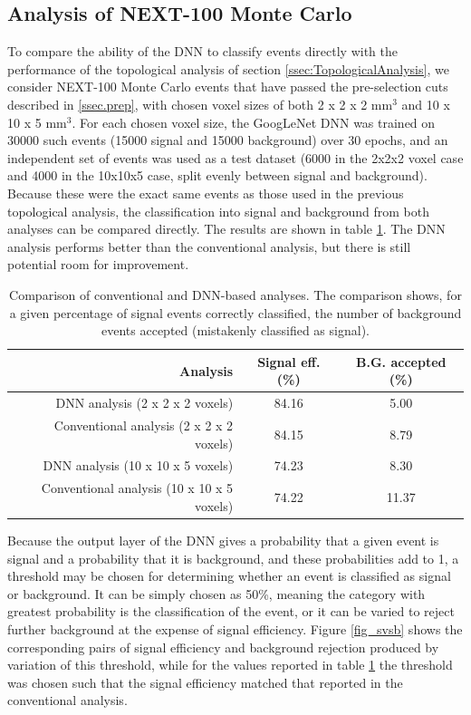 \documentclass[a4paper,11pt]{article}
\begin{document}
\subsection{Analysis of NEXT-100 Monte Carlo}\label{ssec:NEXTMCanalysis}
To compare the ability of the DNN to classify events directly with the performance of the topological analysis of section \ref{ssec:TopologicalAnalysis}, we consider NEXT-100 Monte Carlo 
events that have passed the pre-selection cuts described in \ref{ssec.prep}, with chosen voxel sizes of both 2 x 2 x 2 mm$^3$ and 10 x 10 x 5 mm$^3$.  For each chosen voxel size, the 
GoogLeNet DNN was trained on 30000 such events (15000 signal and 15000 background) over 30 epochs, 
and an independent set of events was used as a test dataset (6000 in the 2x2x2 voxel case and 4000 in the 10x10x5 case, split evenly between signal and background).  Because these were 
the exact same events as those used in the previous
topological analysis, the classification into signal and background from both analyses can be compared directly.  The results are shown in table \ref{tbl.DNNcomparison}.  The DNN
analysis performs better than the conventional analysis, but there is still potential room for improvement.  

\begin{table}[!htb]
	\begin{center}
		\caption[DNN analysis summary]{\label{tbl.DNNcomparison}Comparison of conventional and DNN-based analyses.  The comparison shows, for a given percentage of signal events
			correctly classified, the number of background events accepted (mistakenly classified as signal).}
		\begin{tabular}{rcc}
			\\
			\textbf{Analysis} & \textbf{Signal eff. (\%)} & \textbf{B.G. accepted (\%)}\\
			\hline
			DNN analysis (2 x 2 x 2 voxels) & 84.16 & 5.00\\
			Conventional analysis (2 x 2 x 2 voxels) & 84.15 & 8.79\\
			\hline
			DNN analysis (10 x 10 x 5 voxels) & 74.23 & 8.30\\
			Conventional analysis (10 x 10 x 5 voxels) & 74.22 & 11.37\\
		\end{tabular}
	\end{center}
\end{table}

Because the output layer of the DNN gives a probability that a given event is signal and a probability that it is background, and these probabilities add to 1, a threshold may be 
chosen for determining whether an event is classified as signal or background.  It can be simply chosen as 50\%, meaning the category with greatest probability is the classification of the
event, or it can be varied to reject further background at the expense of signal efficiency.  Figure \ref{fig_svsb} shows the corresponding pairs of signal efficiency and background 
rejection produced by variation of this threshold, while for the values reported in table \ref{tbl.DNNcomparison} the threshold was chosen such that the signal efficiency matched that reported in 
the conventional analysis.
\end{document}
